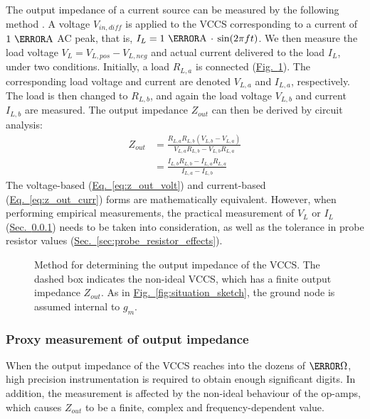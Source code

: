 \documentclass[10pt]{article}
\newcommand{\briefeqlink}[1]{\hyperref[#1]{Eq.~\ref*{#1}}\xspace }
\newcommand{\briefseclink}[1]{\hyperref[#1]{Sec.~\ref*{#1}}}
\newcommand{\brieffiglink}[1]{\hyperref[#1]{Fig.~\ref*{#1}}}
\begin{document}
The output impedance of a current source can be measured by the following method \cite{pmid24880419}. A voltage $V_{in,dif\!f}$ is applied to the VCCS corresponding to a current of $1~\milli\ampere$ AC peak, that is, $I_L=1~\milli\ampere\,\cdot\,\sin(2\pi{}ft)$. We then measure the load voltage $V_L=V_{L,pos}-V_{L,neg}$ and actual current delivered to the load $I_L$, under two conditions. Initially, a load $R_{L,a}$ is connected (\brieffiglink{fig:impedance_measurement_method}). The corresponding load voltage and current are denoted $V_{L,a}$ and $I_{L,a}$, respectively. The load is then changed to $R_{L,b}$, and again the load voltage $V_{L,b}$ and current $I_{L,b}$ are measured. The output impedance $Z_{out}$ can then be derived by circuit analysis:
\begin{subequations}
\label{eq:z_out}
\begin{align}
Z_{out} &= \frac{R_{L,a} R_{L,b} (V_{L,b} - V_{L,a})} {V_{L,a}R_{L,b} - V_{L,b} R_{L,a}} \label{eq:z_out_volt} \\
& = \frac{I_{L,b} R_{L,b} - I_{L,a} R_{L,a}} {I_{L,a} - I_{L,b}} \label{eq:z_out_curr}
\end{align}
\end{subequations}
The voltage-based (\briefeqlink{eq:z_out_volt}) and current-based (\briefeqlink{eq:z_out_curr}) forms are mathematically equivalent. However, when performing empirical measurements, the practical measurement of $V_L$ or $I_L$ (\briefseclink{sec:proxy_output_impedance}) needs to be taken into consideration, as well as the tolerance in probe resistor values (\briefseclink{sec:probe_resistor_effects}).

\begin{figure}[t!]
\centering

\caption{\small Method for determining the output impedance of the VCCS. The dashed box indicates the non-ideal VCCS, which has a finite output impedance $Z_{out}$. As in \brieffiglink{fig:situation_sketch}, the ground node is assumed internal to $g_m$.}
\label{fig:impedance_measurement_method}
\end{figure}

\subsubsection{Proxy measurement of output impedance}
\label{sec:proxy_output_impedance}

When the output impedance of the VCCS reaches into the dozens of $\mega\ohm$, high precision instrumentation is required to obtain enough significant digits. In addition, the measurement is affected by the non-ideal behaviour of the op-amps, which causes $Z_{out}$ to be a finite, complex and frequency-dependent value.
\end{document}
